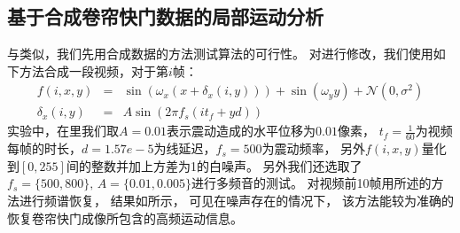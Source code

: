\subsection{基于合成卷帘快门数据的局部运动分析\label{sec:synth-local}}
与类似，我们先用合成数据的方法测试算法的可行性。
对进行修改，我们使用如下方法合成一段视频，对于第$i$帧：
\begin{eqnarray}
    f(i, x, y) &=& \sin(\omega_x (x + \delta_x(i, y))) + \sin(\omega_y y) + 
    \mathcal{N}(0, \sigma^2) \\
    \delta_x(i, y) &=& A\sin(2\pi f_s(it_f+yd))
    \label{eqn:synth-local}
\end{eqnarray}
实验中，在里我们取$A=0.01$表示震动造成的水平位移为$0.01$像素，
$t_f=\frac{1}{60}$为视频每帧的时长，$d=1.57e-5$为线延迟，$f_s=500$为震动频率，
另外$f(i, x, y)$量化到$[0, 255]$间的整数并加上方差为1的白噪声。
另外我们还选取了$f_s=\{500, 800\},\,A=\{0.01, 0.005\}$进行多频音的测试。
对视频前10帧用所述的方法进行频谱恢复，
结果如所示，
可见在噪声存在的情况下，
该方法能较为准确的恢复卷帘快门成像所包含的高频运动信息。
